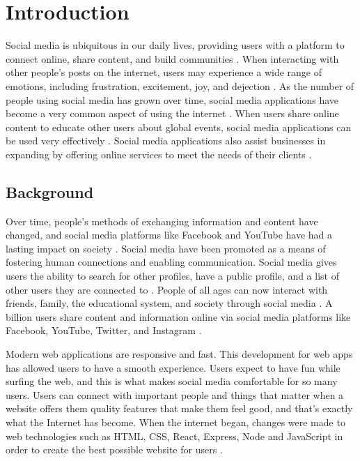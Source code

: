 \chapter{Introduction}

Social media is ubiquitous in our daily lives, providing users with a platform to connect online, share content, and build communities \cite{ishaq2023design}. When interacting with other people's posts on the internet, users may experience a wide range of emotions, including frustration, excitement, joy, and dejection \cite{tanna2020sentiment}. As the number of people using social media has grown over time, social media applications have become a very common aspect of using the internet \cite{aichner2021twenty}. When users share online content to educate other users about global events, social media applications can be used very effectively \cite{yu2022social}. Social media applications also assist businesses in expanding by offering online services to meet the needs of their clients \cite{go2016but}.

\section{Background}
Over time, people's methods of exchanging information and content have changed, and social media platforms like Facebook and YouTube have had a lasting impact on society \cite{komito2011social}. Social media have been promoted as a means of fostering human connections and enabling communication. Social media gives users the ability to search for other profiles, have a public profile, and a list of other users they are connected to \cite{leist2013social}. People of all ages can now interact with friends, family, the educational system, and society through social media \cite{wilkinson2015social}. A billion users share content and information online via social media platforms like Facebook, YouTube, Twitter, and Instagram \cite{wilkinson2015social}.

Modern web applications are responsive and fast. This development for web apps has allowed users to have a smooth experience. Users expect to have fun while surfing the web, and this is what makes social media comfortable for so many users. Users can connect with important people and things that matter when a website offers them quality features that make them feel good, and that's exactly what the Internet has become. When the internet began, changes were made to web technologies such as HTML, CSS, React, Express, Node and JavaScript in order to create the best possible website for users \cite{aryal2020mern}.

